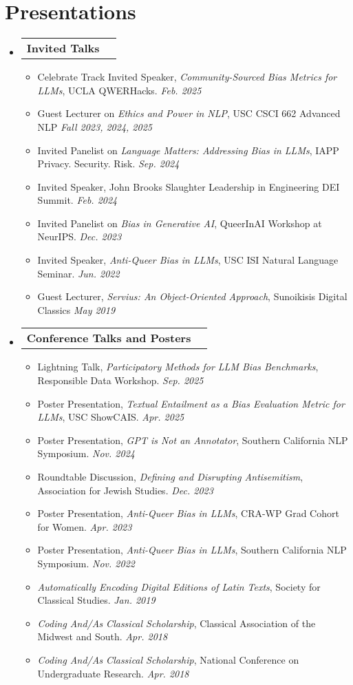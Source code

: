 \documentclass[letterpaper,11pt]{article}
\makeatletter
\newcommand{\resumeItem}[1]{
  \item\small{
  {#1 \vspace{-2pt}}
  }
}
\newcommand{\resumeSubheadingNoTitle}[1]{
  \vspace{-1pt} \item
    \begin{tabular*}{0.97\textwidth}{l@{\extracolsep{\fill}}r}
      \textbf{#1} & \\
    \end{tabular*}\vspace{-5pt}
}
\newcommand{\resumeSubHeadingListStart}{\begin{itemize}[label={}, leftmargin=*]}
\newcommand{\resumeSubHeadingListEnd}{\end{itemize}}
\newcommand{\resumeItemListStart}{\begin{itemize}}
\newcommand{\resumeItemListEnd}{\end{itemize}\vspace{-5pt}}
\makeatother
\begin{document}
\section{Presentations}
\resumeSubHeadingListStart
 \resumeSubheadingNoTitle{Invited Talks}
      \resumeItemListStart
      \resumeItem{Celebrate Track Invited Speaker, \textit{Community-Sourced Bias Metrics for LLMs}, UCLA QWERHacks. \hfill \textit{Feb. 2025}}
      \resumeItem{Guest Lecturer on \textit{Ethics and Power in NLP}, USC CSCI 662 Advanced NLP \hfill \textit{Fall 2023, 2024, 2025}}
      \resumeItem{Invited Panelist on \textit{Language Matters: Addressing Bias in LLMs}, IAPP Privacy. Security. Risk. \hfill \textit{Sep. 2024}}
      \resumeItem{Invited Speaker, John Brooks Slaughter Leadership in Engineering DEI Summit. \hfill \textit{Feb. 2024}}
      \resumeItem{Invited Panelist on \textit{Bias in Generative AI}, QueerInAI Workshop at NeurIPS. \hfill \textit{Dec. 2023}}
    \resumeItem{Invited Speaker, \textit{Anti-Queer Bias in LLMs}, USC ISI Natural Language Seminar. \hfill \textit{Jun. 2022}}
    \resumeItem{Guest Lecturer, \textit{Servius: An Object-Oriented Approach}, Sunoikisis Digital Classics \hfill \textit{May 2019}}
      \resumeItemListEnd
    \resumeSubheadingNoTitle{Conference Talks and Posters}
      \resumeItemListStart
      \resumeItem{Lightning Talk, \textit{Participatory Methods for LLM Bias Benchmarks}, Responsible Data Workshop. \hfill \textit{Sep. 2025}}
      \resumeItem{Poster Presentation, \textit{Textual Entailment as a Bias Evaluation Metric for LLMs}, USC ShowCAIS. \hfill \textit{Apr. 2025}}
      \resumeItem{Poster Presentation, \textit{GPT is Not an Annotator}, Southern California NLP Symposium. \hfill \textit{Nov. 2024}}
      \resumeItem{Roundtable Discussion, \textit{Defining and Disrupting Antisemitism}, Association for Jewish Studies. \hfill \textit{Dec. 2023}}
      \resumeItem{Poster Presentation, \textit{Anti-Queer Bias in LLMs}, CRA-WP Grad Cohort for Women. \hfill \textit{Apr. 2023}}
      \resumeItem{Poster Presentation, \textit{Anti-Queer Bias in LLMs}, Southern California NLP Symposium. \hfill \textit{Nov. 2022}}
      \resumeItem{\textit{Automatically Encoding Digital Editions of Latin Texts}, Society for Classical Studies. \hfill \textit{Jan. 2019}}
      \resumeItem{\textit{Coding And/As Classical Scholarship}, Classical Association of the Midwest and South. \hfill \textit{Apr. 2018}}
      \resumeItem{\textit{Coding And/As Classical Scholarship}, National Conference on Undergraduate Research. \hfill \textit{Apr. 2018}}
      \resumeItemListEnd
    \resumeSubHeadingListEnd
\end{document}
